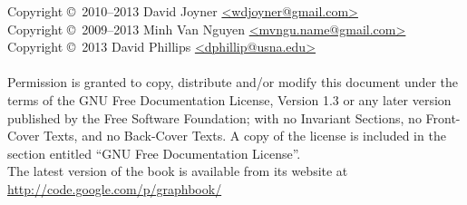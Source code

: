 \noindent Copyright \copyright\ 2010--2013 David Joyner \url{<wdjoyner@gmail.com>} \\
Copyright \copyright\ 2009--2013 Minh Van Nguyen \url{<mvngu.name@gmail.com>} \\
Copyright \copyright\ 2013 David Phillips \url{<dphillip@usna.edu>} \\\\
Permission is granted to copy, distribute and/or modify this document
under the terms of the GNU Free Documentation License, Version 1.3
or any later version published by the Free Software Foundation;
with no Invariant Sections, no Front-Cover Texts, and no
Back-Cover Texts. A copy of the license is included in the section
entitled ``GNU Free Documentation License''. \\

\noindent
The latest version of the book is available from its website at \\

\url{http://code.google.com/p/graphbook/}
